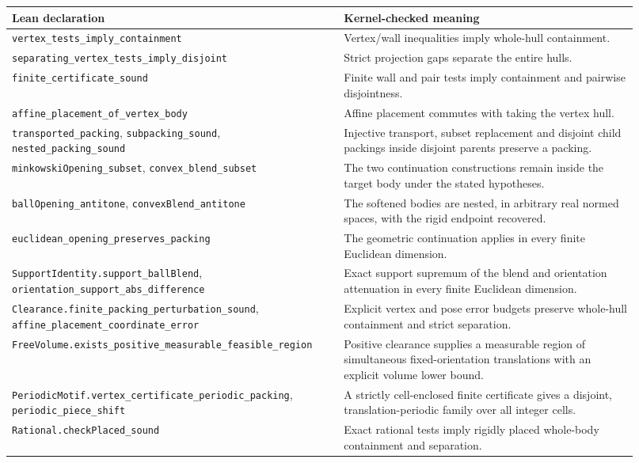 \documentclass[11pt,a4paper]{article}
\newcommand{\code}[1]{\texttt{\nolinkurl{#1}}}
\begin{document}
\begin{table}[htbp]
\centering\small
\begin{tabular}{>{\scriptsize}p{0.48\linewidth}p{0.44\linewidth}}
\toprule
Lean declaration & Kernel-checked meaning\\
\midrule
\code{vertex_tests_imply_containment} & Vertex/wall inequalities imply whole-hull containment.\\
\code{separating_vertex_tests_imply_disjoint} & Strict projection gaps separate the entire hulls.\\
\code{finite_certificate_sound} & Finite wall and pair tests imply containment and pairwise disjointness.\\
\code{affine_placement_of_vertex_body} & Affine placement commutes with taking the vertex hull.\\
\code{transported_packing}, \code{subpacking_sound}, \code{nested_packing_sound} & Injective transport, subset replacement and disjoint child packings inside disjoint parents preserve a packing.\\
\code{minkowskiOpening_subset}, \code{convex_blend_subset} & The two continuation constructions remain inside the target body under the stated hypotheses.\\
\code{ballOpening_antitone}, \code{convexBlend_antitone} & The softened bodies are nested, in arbitrary real normed spaces, with the rigid endpoint recovered.\\
\code{euclidean_opening_preserves_packing} & The geometric continuation applies in every finite Euclidean dimension.\\
\code{SupportIdentity.support_ballBlend}, \code{orientation_support_abs_difference} & Exact support supremum of the blend and orientation attenuation in every finite Euclidean dimension.\\
\code{Clearance.finite_packing_perturbation_sound}, \code{affine_placement_coordinate_error} & Explicit vertex and pose error budgets preserve whole-hull containment and strict separation.\\
\code{FreeVolume.exists_positive_measurable_feasible_region} & Positive clearance supplies a measurable region of simultaneous fixed-orientation translations with an explicit volume lower bound.\\
\code{PeriodicMotif.vertex_certificate_periodic_packing}, \code{periodic_piece_shift} & A strictly cell-enclosed finite certificate gives a disjoint, translation-periodic family over all integer cells.\\
\code{Rational.checkPlaced_sound} & Exact rational tests imply rigidly placed whole-body containment and separation.\\

\end{tabular}
\end{table}
\end{document}

